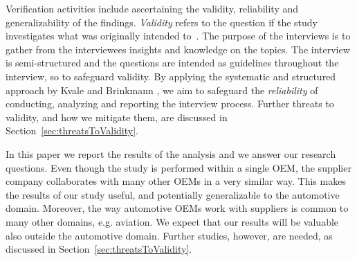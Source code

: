 
 Verification activities include ascertaining the validity, reliability and generalizability of the findings. {\em Validity} refers to the question if the study investigates what was originally intended to~\cite{Kvale2015Interviews}. The purpose of the interviews is to gather from the interviewees insights and knowledge on the topics. The interview is semi-structured and the questions are intended as guidelines throughout the interview, so to safeguard validity. %
By applying the systematic and structured approach by Kvale and Brinkmann \cite{Kvale2015Interviews}, we aim to safeguard the {\em reliability} of conducting, analyzing and reporting the interview process. Further threats to validity, and how we mitigate them, are discussed in Section~\ref{sec:threatsToValidity}.

 In this paper we report the results of the analysis and we answer our research questions. 
Even though the study is performed within a single OEM, the supplier company collaborates with many other OEMs %
{in a very similar way}. 
This %
{makes} the results of our study %
{useful, and potentially generalizable} to the automotive domain. 
Moreover, the way automotive OEMs work with suppliers is common to many other domains, e.g. aviation. We expect that our results will be valuable also outside the automotive domain. Further studies, however, are needed, as discussed in Section~\ref{sec:threatsToValidity}.


